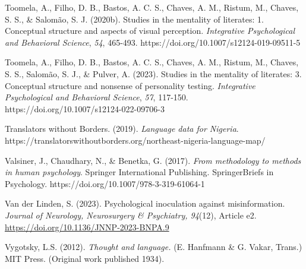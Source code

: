 \documentclass[authordate, empirical]{jote-new-article}
\begin{document}
	Toomela, A., Filho, D. B., Bastos, A. C. S., Chaves, A. M., Ristum, M., Chaves, S. S., \& Salomão, S. J. (2020b). Studies in the mentality of literates: 1. Conceptual structure and aspects of visual perception. \emph{Integrative Psychological and Behavioral Science}, \emph{54}, 465-493. https://doi.org/10.1007/s12124-019-09511-5



	Toomela, A., Filho, D. B., Bastos, A. C. S., Chaves, A. M., Ristum, M., Chaves, S. S., Salomão, S. J., \& Pulver, A. (2023). Studies in the mentality of literates: 3. Conceptual structure and nonsense of personality testing. \emph{Integrative Psychological and Behavioral Science}, \emph{57}, 117-150. https://doi.org/10.1007/s12124-022-09706-3



	Translators without Borders. (2019). \emph{Language data for Nigeria}. https://translatorswithoutborders.org/northeast-nigeria-language-map/



	Valsiner, J., Chaudhary, N., \& Benetka, G. (2017). \emph{From methodology to methods in human psychology}. Springer International Publishing. SpringerBriefs in Psychology. https://doi.org/10.1007/978-3-319-61064-1



	Van der Linden, S. (2023). Psychological inoculation against misinformation. \emph{Journal of Neurology, Neurosurgery \& Psychiatry, 94}(12), Article e2. \href{https://doi.org/10.1136/JNNP-2023-BNPA.9}{https://doi.org/10.1136/JNNP-2023-BNPA.9}



	Vygotsky, L.S. (2012). \emph{Thought and language. }(E. Hanfmann \& G. Vakar, Trans.) MIT Press. (Original work published 1934).
\end{document}
